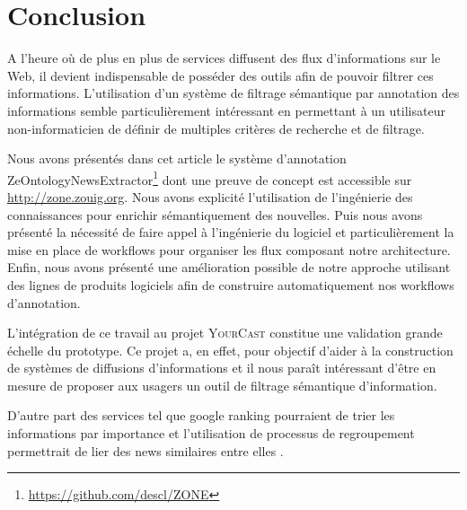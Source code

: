 \documentclass[]{easychair}
\newcommand{\Y}[0]{\textsc{YourCast}\xspace}
\begin{document}
\section{Conclusion}
\label{sect:conclusion}
A l'heure où de plus en plus de services diffusent des flux d'informations sur le Web, il devient indispensable de posséder des outils afin de pouvoir filtrer ces informations. L'utilisation d'un système de filtrage sémantique par annotation des informations semble particulièrement intéressant en permettant à un utilisateur non-informaticien de définir de multiples critères de recherche et de filtrage.

Nous avons présentés dans cet article le système d'annotation ZeOntologyNewsExtractor\footnote{\url{https://github.com/descl/ZONE}} dont une preuve de concept est accessible sur \url{http://zone.zouig.org}. Nous avons explicité l'utilisation de l'ingénierie des connaissances pour enrichir sémantiquement des nouvelles. Puis nous avons présenté la nécessité de faire appel à l'ingénierie du logiciel et particulièrement la mise en place de workflows pour organiser les flux composant notre architecture. Enfin, nous avons présenté une amélioration possible de notre approche utilisant des lignes de produits logiciels afin de construire automatiquement nos workflows d'annotation.

L'intégration de ce travail au projet \Y constitue une validation  grande échelle du prototype. Ce projet a, en effet, pour objectif d'aider à la construction de systèmes de diffusions d'informations et il nous paraît intéressant d'être en mesure de proposer aux usagers un outil de filtrage sémantique d'information.

D'autre part des services tel que google ranking pourraient de trier les informations par importance et l'utilisation de processus de regroupement permettrait de lier des news similaires entre elles \cite{Taddesse2010}.

%

\label{sect:bib}



\appendix


\end{document}
